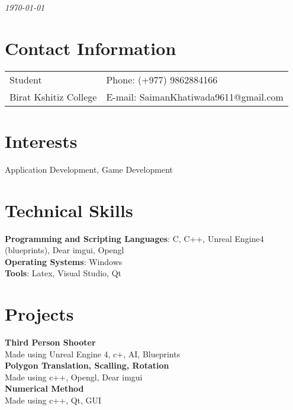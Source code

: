 \documentclass[margin,line]{res}
\begin{document}
 \hfill {\em \today}

\begin{resume}
\section{\sc Contact Information}

\vspace{.05in}
\begin{tabular}{@{}p{3.5in}p{3in}}
Student            & {Phone:}  (+977) 9862884166 \\
Birat Kshitiz College
 & {E-mail:}  SaimanKhatiwada9611@gmail.com\\
\end{tabular}


\section{\sc Interests}

Application Development, Game Development

\section{\sc Technical Skills}
{\bf Programming and Scripting Languages}:  C, C++, Unreal Engine4 (blueprints), Dear imgui, Opengl\\
{\bf Operating Systems}: Windows\\
{\bf Tools}:  Latex, Visual Studio, Qt  \\

\section{\sc Projects}
{\bf Third Person Shooter}\\
Made using Unreal Engine 4, c+, AI, Blueprints\\

{\bf Polygon Translation, Scalling, Rotation}\\
Made using c++, Opengl, Dear imgui\\

{\bf Numerical Method}\\
Made using c++, Qt, GUI\\

\end{resume}
\end{document}
